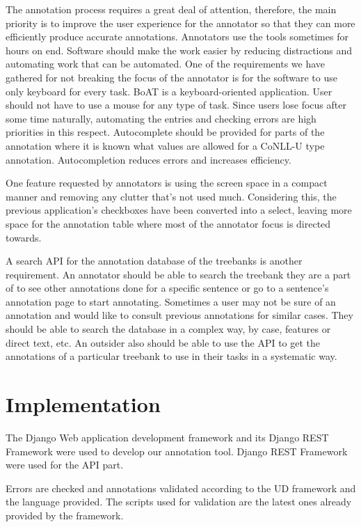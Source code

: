 \documentclass[
]{ceurart}
\begin{document}
The annotation process requires a great deal of attention, therefore, the main priority is to improve the user experience for the annotator so that they can more efficiently produce accurate annotations.
Annotators use the tools sometimes for hours on end.
Software should make the work easier by reducing distractions and automating work that can be automated.
One of the requirements we have gathered for not breaking the focus of the annotator is for the software to use only keyboard for every task.
BoAT is a keyboard-oriented application.
User should not have to use a mouse for any type of task.
Since users lose focus after some time naturally, automating the entries and checking errors are high priorities in this respect.
Autocomplete should be provided for parts of the annotation where it is known what values are allowed for a CoNLL-U type annotation.
Autocompletion reduces errors and increases efficiency.

One feature requested by annotators is using the screen space in a compact manner and removing any clutter that's not used much.
Considering this, the previous application's checkboxes have been converted into a select, leaving more space for the annotation table where most of the annotator focus is directed towards.

A search API for the annotation database of the treebanks is another requirement.
An annotator should be able to search the treebank they are a part of to see other annotations done for a specific sentence or go to a sentence's annotation page to start annotating.
Sometimes a user may not be sure of an annotation and would like to consult previous annotations for similar cases.
They should be able to search the database in a complex way, by case, features or direct text, etc.
An outsider also should be able to use the API to get the annotations of a particular treebank to use in their tasks in a systematic way.

\section{Implementation}
\label{sec:implementation}

The Django\cite{django} Web application development framework and its Django REST Framework\cite{drf} were used to develop our annotation tool.
Django REST Framework were used for the API part.

Errors are checked and annotations validated according to the UD framework and the language provided.
The scripts used for validation are the latest ones already provided by the framework.\cite{UD-git}
\end{document}
